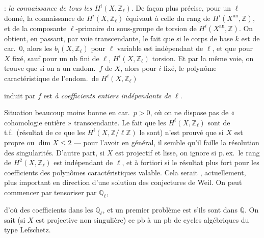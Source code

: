 \documentclass[11pt,a4paper]{article}
\begin{document}

  : \emph{la
connaissance de tous les $H^{i}(X, \mathbb{Z}_\ell)$}. De façon plus précise, pour un $\ell$ donné, la connaissance de
$H^{i}(X, \mathbb{Z}_\ell)$ équivaut à celle du rang  de
$H^{i}(X^{\mathrm{an}}, \mathbb{Z})$,  et de la composante
$\ell$-primaire du sous-groupe de torsion de
$H^{i}(X^{\mathrm{an}}, \mathbb{Z})$. On obtient, en passant, par voie
transcendante, le fait que si le corps de base $k$ est de car.\ $0$, alors
les 
$b_i(X, \mathbb{Z}_\ell)$  pour $\ell$ variable est
indépendant de $\ell$, et que pour $X$ fixé, sauf pour un nb fini de
$\ell$,  $H^{i}(X, \mathbb{Z}_\ell)$ \ill{} \ill{} torsion. Et
par la même voie, on trouve  que si on a un endom.\ $f$ de
$X$, alors pour $i$ fixé,  le polynôme caractéristique
de l'endom.\ de $H^{i}(X, \mathbb{Z}_\ell)$


induit par $f$ est \emph{à coefficients entiers indépendants de $\ell$}.

Situation beaucoup moins bonne en car.\ $p > 0$, où on ne dispose pas de
« cohomologie entière » transcendante. Le fait que les
$H^{i}(X, \mathbb{Z}_\ell)$ sont de t.f.\ (résultat de ce que les
$H^{i}(X, \mathbb{Z}/\ell\mathbb{Z})$ le sont) n'est prouvé que si $X$
est propre ou $\dim X \leq 2$ --- pour l'avoir en général, il semble qu'il
faille la résolution des singularités. D'autre part,  si $X$ est
projectif et lisse, on ignore si p.\,ex.\ le rang de
$H^{2}(X, \mathbb{Z}_\ell)$ est indépendant de $\ell$, et à fortiori si le
résultat plus fort pour les coefficients des polynômes caractéristiques
 valable. Cela serait ,
actuellement,  \ill{} plus important \ill{} en
direction d'une solution des conjectures de Weil. \struck{\ill{}} On peut
commencer par tensoriser par $\mathbb{Q}_\ell$,


d'où des coefficients dans les $\mathbb{Q}_\ell$, et un premier problème
est s'ils sont dans $\mathbb{Q}$. On sait (si $X$ est projective non
singulière)  ce pb à un pb de cycles algébriques du type
Lefschetz.
\end{document}
